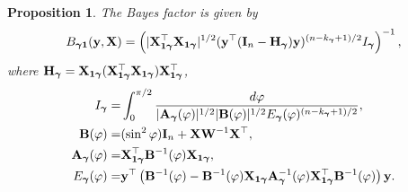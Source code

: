\documentclass[11pt]{article}
\newcommand{\By}{\mathbf{y}}    \newcommand{\Bz}{\mathbf{z}}
\newcommand{\BA}{\mathbf{A}}    \newcommand{\BB}{\mathbf{B}}    \newcommand{\BC}{\mathbf{C}}    \newcommand{\BD}{\mathbf{D}}    \newcommand{\BE}{\mathbf{E}}    \newcommand{\BF}{\mathbf{F}}    \newcommand{\BG}{\mathbf{G}}    \newcommand{\BH}{\mathbf{H}}    \newcommand{\BI}{\mathbf{I}}    \newcommand{\BJ}{\mathbf{J}}    \newcommand{\BK}{\mathbf{K}}    \newcommand{\BL}{\mathbf{L}}
\newcommand{\bfsym}[1]{\ensuremath{\boldsymbol{#1}}}
\def\bgamma{\bfsym \gamma}             \def\bGamma{\bfsym \Gamma}
\theoremstyle{plain}
\newtheorem{proposition}{\quad\quad Proposition}
\theoremstyle{definition}
\theoremstyle{remark}
\begin{document}
\begin{proposition}
    The Bayes factor is given by
    \begin{equation*}
        B_{\bgamma \mathbf 1} (\By, \BX)
        =
        \left(
            |\BX^\top_{\mathbf 1 \bgamma} \BX_{\mathbf 1 \bgamma}|^{1/2}
            (\By^\top (\BI_n -\BH_{\bgamma}) \By)^{(n-k_{\bgamma}+1)/2} I_{\bgamma}
        \right)^{-1}
        ,
    \end{equation*}
    where $\BH_{\bgamma}= \BX_{\mathbf 1 \bgamma} (\BX_{\mathbf 1 \bgamma}^\top\BX_{\mathbf 1 \bgamma})\BX_{\mathbf 1 \bgamma}^\top$,
    \begin{align*}
        I_{\bgamma}=& \int_{0}^{\pi/2}\frac{d\varphi}{|\BA_{\bgamma}(\varphi)|^{1/2} |\BB(\varphi)|^{1/2} E_{\bgamma} (\varphi)^{(n-k_{\bgamma}+1)/2}},
        \\
        \BB(\varphi)=& (\sin^2 \varphi) \BI_n + \BX \BW^{-1} \BX^\top,
        \\
        \BA_{\bgamma} (\varphi) =& \BX_{\mathbf 1 \bgamma}^\top \BB^{-1} (\varphi) \BX_{\mathbf 1 \bgamma},
        \\
        E_{\bgamma} (\varphi) =& \By^\top \left( \BB^{-1} (\varphi)- \BB^{-1}(\varphi) \BX_{\mathbf 1 \bgamma} \BA_{\bgamma}^{-1} (\varphi) \BX_{\mathbf 1 \bgamma}^\top \BB^{-1} (\varphi)\right) \By
        .
    \end{align*}
\end{proposition}
\end{document}
